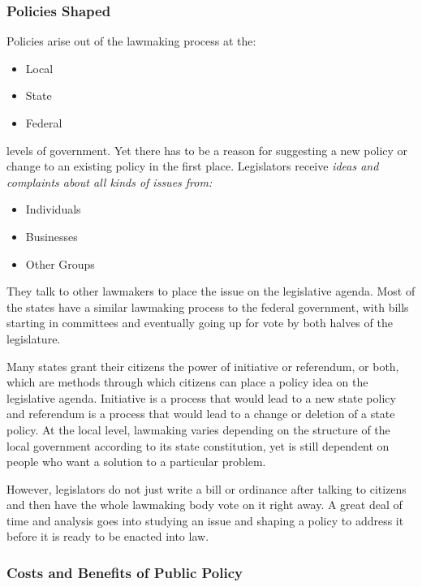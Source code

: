 \subsubsection*{Policies Shaped}

Policies arise out of the lawmaking process at the:

\begin{itemize}
    \item Local
    \item State
    \item Federal
\end{itemize}

levels of government. Yet there has to be a reason for suggesting a new policy or change to an existing policy in the first place. Legislators receive \it{ideas} and \it{complaints} about all kinds of issues from:

\begin{itemize}
    \item Individuals
    \item Businesses
    \item Other Groups
\end{itemize}

They talk to other lawmakers to place the issue on the legislative agenda. Most of the states have a similar lawmaking process to the federal government, with bills starting in committees and eventually going up for vote by both halves of the legislature.

Many states grant their citizens the power of initiative or referendum, or both, which are methods through which citizens can place a policy idea on the legislative agenda. Initiative is a process that would lead to a new state policy and referendum is a process that would lead to a change or deletion of a state policy. At the local level, lawmaking varies depending on the structure of the local government according to its state constitution, yet is still dependent on people who want a solution to a particular problem.

However, legislators do not just write a bill or ordinance after talking to citizens and then have the whole lawmaking body vote on it right away. A great deal of time and analysis goes into studying an issue and shaping a policy to address it before it is ready to be enacted into law.

\subsubsection*{Costs and Benefits of Public Policy}

